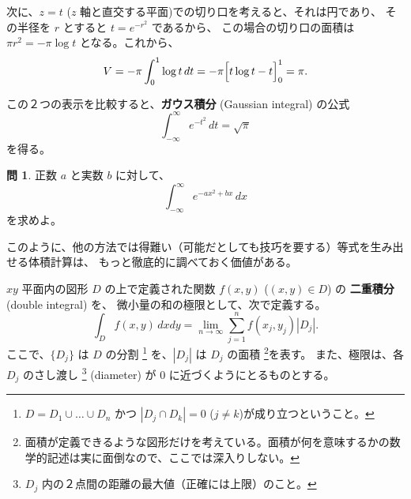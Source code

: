 \documentclass[a4paper]{jsarticle}
\theoremstyle{definition}
\newtheorem{Example}[Theorem]{例}
\newtheorem{Exercise}{問}%
\theoremstyle{remark}
\begin{document}
次に、$z=t$ ($z$ 軸と直交する平面)での切り口を考えると、それは円であり、
その半径を $r$ とすると $t = e^{-r^2}$ であるから、
この場合の切り口の面積は $\pi r^2 = -\pi \log t$ となる。これから、
\[
V = - \pi \int_0^1 \log t\, dt = -\pi \Bigl[t\log t - t\Bigr]_0^1 
= \pi. 
\]

この２つの表示を比較すると、\textbf{ガウス積分} (Gaussian integral) の公式
\[
\int_{-\infty}^\infty e^{-t^2}\, dt = \sqrt{\pi}
\]
を得る。

\begin{Exercise}
正数 $a$ と実数 $b$ に対して、
\[
\int_{-\infty}^\infty e^{-ax^2 + bx}\, dx 
\]
を求めよ。
\end{Exercise}





このように、他の方法では得難い（可能だとしても技巧を要する）等式を生み出せる体積計算は、
もっと徹底的に調べておく価値がある。

$xy$ 平面内の図形 $D$ の上で定義された関数 $f(x,y)$ ($(x,y) \in D$) の
\textbf{二重積分} (double integral) を、
微小量の和の極限として、次で定義する。
\[ 
\int_D f(x,y)\, dxdy = \lim_{n \to \infty} \sum_{j=1}^n f(x_j,y_j) |D_j|. 
\]
ここで、$\{ D_j\}$ は $D$ の分割
\footnote{$D = D_1 \cup \dots \cup D_n$ かつ $|D_j \cap D_k| = 0$ ($j \not= k$)が成り立つということ。}
を、$|D_j|$ は $D_j$ の面積
\footnote{面積が定義できるような図形だけを考えている。面積が何を意味するかの数学的記述は実に面倒なので、ここでは深入りしない。}を表す。
また、極限は、各 $D_j$ のさし渡し
\footnote{$D_j$ 内の２点間の距離の最大値（正確には上限）のこと。} (diameter) が $0$ 
に近づくようにとるものとする。
\end{document}
